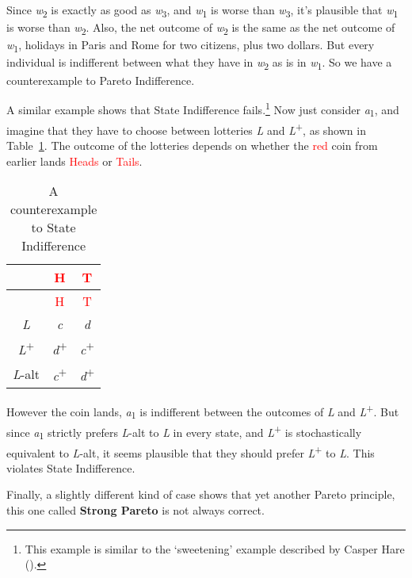 \documentclass[
  11pt,
  letterpaper,
  DIV=11,
  numbers=noendperiod,
  twoside]{scrartcl}
\begin{document}
Since \emph{w}\textsubscript{2} is exactly as good as
\emph{w}\textsubscript{3}, and \emph{w}\textsubscript{1} is worse than
\emph{w}\textsubscript{3}, it's plausible that \emph{w}\textsubscript{1}
is worse than \emph{w}\textsubscript{2}. Also, the net outcome of
\emph{w}\textsubscript{2} is the same as the net outcome of
\emph{w}\textsubscript{1}, holidays in Paris and Rome for two citizens,
plus two dollars. But every individual is indifferent between what they
have in \emph{w}\textsubscript{2} as is in \emph{w}\textsubscript{1}. So
we have a counterexample to Pareto Indifference.

A similar example shows that State Indifference fails.\footnote{This
  example is similar to the `sweetening' example described by Casper
  Hare ().} Now just consider
\emph{a}\textsubscript{1}, and imagine that they have to choose between
lotteries \emph{L} and \emph{L}\textsuperscript{+}, as shown in
Table~\ref{tbl-state-indifference}. The outcome of the lotteries depends
on whether the \textcolor{red}{red} coin from earlier lands
\textcolor{red}{Heads} or \textcolor{red}{Tails}.

\begin{longtable}[]{@{}ccc@{}}
\caption{A counterexample to State
Indifference}\label{tbl-state-indifference}\tabularnewline
\toprule\noalign{}
& \textcolor{red}{H} & \textcolor{red}{T} \\
\midrule\noalign{}
\endfirsthead
\toprule\noalign{}
& \textcolor{red}{H} & \textcolor{red}{T} \\
\midrule\noalign{}
\endhead
\bottomrule\noalign{}
\endlastfoot
\emph{L} & \emph{c} & \emph{d} \\
\emph{L}\textsuperscript{+} & \emph{d}\textsuperscript{+} &
\emph{c}\textsuperscript{+} \\
\emph{L}-alt & \emph{c}\textsuperscript{+} &
\emph{d}\textsuperscript{+} \\
\end{longtable}

However the coin lands, \emph{a}\textsubscript{1} is indifferent between
the outcomes of \emph{L} and \emph{L}\textsuperscript{+}. But since
\emph{a}\textsubscript{1} strictly prefers \emph{L}-alt to \emph{L} in
every state, and \emph{L}\textsuperscript{+} is stochastically
equivalent to \emph{L}-alt, it seems plausible that they should prefer
\emph{L}\textsuperscript{+} to \emph{L}. This violates State
Indifference.

Finally, a slightly different kind of case shows that yet another Pareto
principle, this one called \textbf{Strong Pareto} is not always correct.
\end{document}
